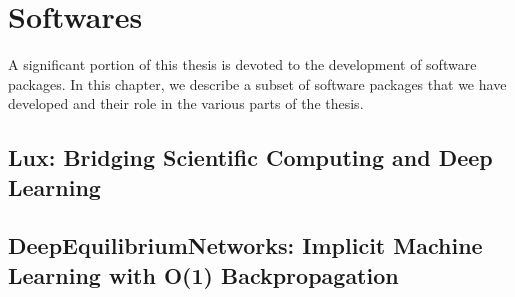\chapter{Softwares}
\label{chapter:softwares}

A significant portion of this thesis is devoted to the development of software packages. In this chapter, we describe a subset of software packages that we have developed and their role in the various parts of the thesis.

\section{Lux: Bridging Scientific Computing and Deep Learning}
\label{sec:lux_software}

\section{DeepEquilibriumNetworks: Implicit Machine Learning with O(1) Backpropagation}
\label{sec:deep_equilibrium_networks_software}
